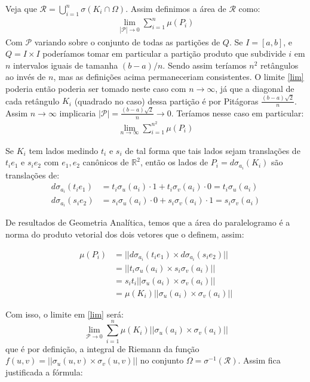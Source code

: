 \documentclass[12pt,letterpaper]{article}
\newcommand\rcur{\mathcal{R}}
\newcommand{\rr}{\mathbb{R}^2}
\begin{document}
		Veja que $\rcur=\displaystyle\bigcup_{i=1}^n\sigma(K_i\cap\Omega)$. Assim definimos a área de $\rcur$ como:
		\begin{align}
			\displaystyle\lim_{|\mathscr{P}|\to0}\sum_{i=1}^n\mu(P_i)\label{lim}
		\end{align}
		Com $\mathscr{P}$ variando sobre o conjunto de todas as partições de $Q$. Se $I=[a,b]$, e $Q=I\times I$ poderíamos tomar em particular a partição produto que subdivide $i$ em $n$ intervalos iguais de tamanha $(b-a)/n$. Sendo assim teríamos $n^2$ retângulos ao invés de $n$, mas as definições acima permaneceriam consistentes. O limite \ref{lim} poderia então poderia ser tomado neste caso com $n\to\infty$, já que a diagonal de cada retângulo $K_i$ (quadrado no caso) dessa partição é por Pitágoras $\frac{(b-a)\sqrt2}n$. Assim $n\to\infty$ implicaria $|\mathscr{P}|=\frac{(b-a)\sqrt2}n\to 0$. Teríamos nesse caso em particular:
		\begin{align*}
			\displaystyle\lim_{n\to\infty}\sum_{i=1}^{n^2}\mu(P_i)
		\end{align*}
	
	 Se $K_i$ tem lados medindo $t_i$ e $s_i$ de tal forma que tais lados sejam translações de $t_ie_1$ e $s_ie_2$ com $e_1,e_2$ canônicos de $\rr$, então os lados de $P_i=d\sigma_{a_i}(K_i)$ são translações de:
	 \begin{align*}
	 	d\sigma_{a_i}(t_ie_1)&=t_i\sigma_u(a_i)\cdot1+t_i\sigma_v(a_i)\cdot0=t_i\sigma_u(a_i)\\
	 	d\sigma_{a_i}(s_ie_2)&=s_i\sigma_u(a_i)\cdot0+s_i\sigma_v(a_i)\cdot1=s_i\sigma_v(a_i)
	 \end{align*}
 
 	De resultados de Geometria Analítica, temos que a área do paralelogramo é a norma do produto vetorial dos dois vetores que o definem, assim:
 	
 	\begin{align*}\mu(P_i)&=||d\sigma_{a_i}(t_ie_1)\times d\sigma_{a_i}(s_ie_2)||\\
 		&=||t_i\sigma_u(a_i)\times s_i\sigma_v(a_i)||\\
 		&=s_it_i||\sigma_u(a_i)\times\sigma_v(a_i)||\\
 		&=\mu(K_i)||\sigma_u(a_i)\times\sigma_v(a_i)||
 	\end{align*}
 
 Com isso, o limite em \ref{lim} será:
 $$\displaystyle\lim_{\mathscr{P}\to0}\sum_{i=1}^n\mu(K_i)||\sigma_u(a_i)\times\sigma_v(a_i)||$$
 que é por definição, a integral de Riemann da função $f(u,v)=||\sigma_u(u,v)\times\sigma_v(u,v)||$ no conjunto $\Omega=\sigma^{-1}(\rcur)$. Assim fica justificada a fórmula:
 
\end{document}

